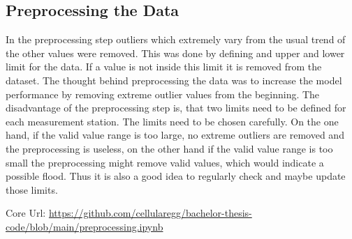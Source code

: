 \subsection{Preprocessing the Data}
In the preprocessing step outliers which extremely vary from the usual trend of the other values were removed. This was done by defining and upper and lower limit for the data. If a value is not inside this limit it is removed from the dataset. The thought behind preprocessing the data was to increase the model performance by removing extreme outlier values from the beginning. The disadvantage of the preprocessing step is, that two limits need to be defined for each measurement station. The limits need to be chosen carefully. On the one hand, if the valid value range is too large, no extreme outliers are removed and the preprocessing is useless, on the other hand if the valid value range is too small the preprocessing might remove valid values, which would indicate a possible flood. Thus it is also a good idea to regularly check and maybe update those limits.
\par
Core Url: \url{https://github.com/cellularegg/bachelor-thesis-code/blob/main/preprocessing.ipynb}

